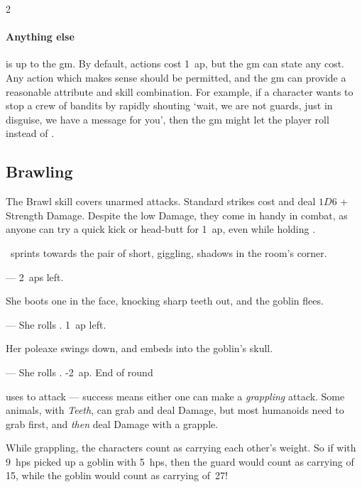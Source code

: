 \begin{multicols}{2}
\paragraph{Anything else}
is up to the \gls{gm}.
By default, \glspl{action} cost 1~\gls{ap}, but the \gls{gm} can state any cost.
Any \gls{action} which makes sense should be permitted, and the \gls{gm} can provide a reasonable \gls{attribute} and \gls{skill} combination.
For example, if a character wants to stop a crew of bandits by rapidly shouting `wait, we are not \glspl{guard}, just in disguise, we have a message for you', then the \gls{gm} might let the player roll  instead of .

\startcontents[Manoeuvres]

\subsection{Brawling}

The Brawl \gls{skill} covers unarmed attacks.
Standard strikes cost  and deal $1D6$ + Strength Damage.
Despite the low Damage, they come in handy in combat, as anyone can try a quick kick or head-butt for 1~\gls{ap}, even while holding .

\begin{exampletext}
  \composeHumanName\ sprints towards the pair of short, giggling, shadows in the room's corner.

  {\sffamily --- 2~\glspl{ap} left.}

  She boots one in the face, knocking sharp teeth out, and the goblin flees.

  {\sffamily ---  She rolls .  1~\gls{ap} left.}

  Her poleaxe swings down, and embeds into the goblin's skull.

  {\sffamily ---  She rolls .  -2~\gls{ap}.  End of \gls{round}}

\end{exampletext}

uses  to
attack --- success means either one can make a \textit{grappling} attack.  Some
animals, with \textit{Teeth}, can grab and deal Damage, but most humanoids need
to grab first, and \emph{then} deal Damage with a grapple.

While grappling, the characters count as carrying each other's \gls{weight}.
So if  with 9~\glspl{hp} picked up a goblin with 5~\glspl{hp}, then
the \gls{guard} would count as carrying  of 15, while the goblin
would count as carrying  of~27!


\end{multicols}
